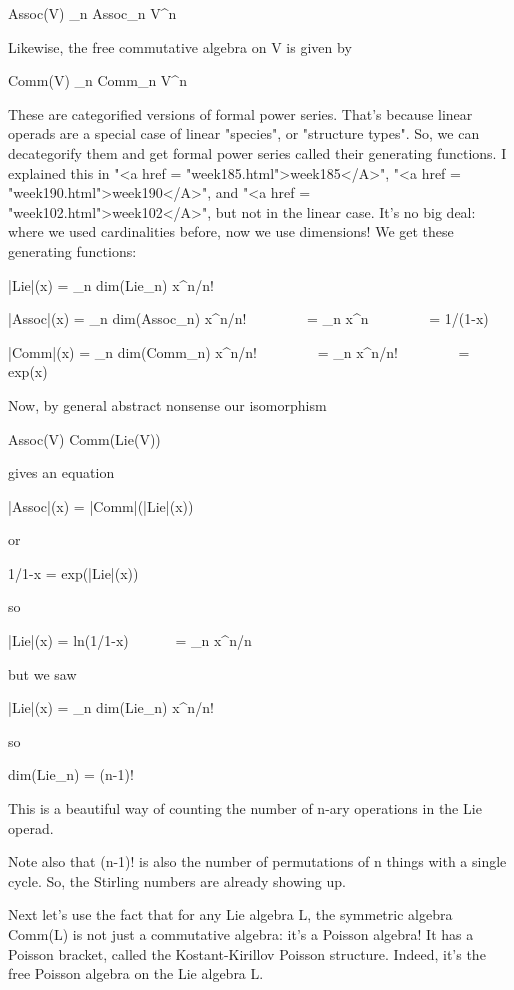 Assoc(V) \cong  \oplus _{n} Assoc_{n} \otimes 
V^{\otimes n}

Likewise, the free commutative algebra on V is given by

Comm(V) \cong  \oplus _{n} Comm_{n} \otimes 
V^{\otimes n}

These are categorified versions of formal power series.  That's
because linear operads are a special case of linear
"species", or "structure types".  So, we can
decategorify them and get formal power series called their generating
functions.  I explained this in "<a href =
"week185.html">week185</A>", "<a href =
"week190.html">week190</A>", and "<a href =
"week102.html">week102</A>", but not in the linear case.  It's no
big deal: where we used cardinalities before, now we use dimensions!
We get these generating functions:

|Lie|(x) = \sum_{n} dim(Lie_{n}) x^{n}/n!
         
|Assoc|(x)  = \sum_{n} dim(Assoc_{n}) x^{n}/n! 
\  \  \  \  \  \  \  \  
         = \sum_{n} x^{n} 
\  \  \  \  \  \  \  \  
         = 1/(1-x)

|Comm|(x)  = \sum_{n} dim(Comm_{n}) x^{n}/n!  
\  \  \  \  \  \  \  \  
         = \sum_{n} x^{n}/n! 
\  \  \  \  \  \  \  \  
         = exp(x)

Now, by general abstract nonsense our isomorphism

Assoc(V) \cong  Comm(Lie(V))

gives an equation

|Assoc|(x) = |Comm|(|Lie|(x))

or 

1/1-x = exp(|Lie|(x))

so

|Lie|(x) = ln(1/1-x) 
\  \  \  \  \  \ 
         = \sum_{n} x^{n}/n

but we saw

|Lie|(x) = \sum_{n} dim(Lie_{n}) x^{n}/n!

so 

dim(Lie_{n}) = (n-1)!

This is a beautiful way of counting the number of n-ary operations in 
the Lie operad.

Note also that (n-1)! is also the number of permutations of n things
with a single cycle.  So, the Stirling numbers are already showing up.

Next let's use the fact that for any Lie algebra L, the symmetric
algebra Comm(L) is not just a commutative algebra: it's a Poisson
algebra!  It has a Poisson bracket, called the Kostant-Kirillov
Poisson structure.  Indeed, it's the free Poisson algebra on the Lie
algebra L.

